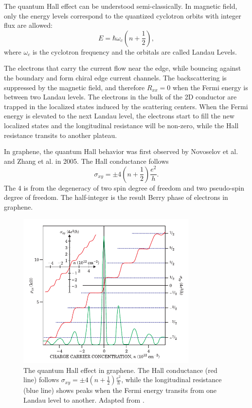 \documentclass[pdflatex, sectionletters, 12pt]{pittetd}    %
\begin{document}
The quantum Hall effect can be understood semi-classically. In magnetic field, only the energy levels correspond to the quantized cyclotron orbits with integer flux are allowed:
$$E = \hbar\omega_c \left(n + \frac{1}{2}\right),$$
where $\omega_c$ is the cyclotron frequency and the orbitals are called Landau Levels.

The electrons that carry the current flow near the edge, while bouncing against the boundary and form chiral edge current channels. The backscattering is suppressed by the magnetic field, and therefore $R_{xx} = 0$ when the Fermi energy is between two Landau levels. The electrons in the bulk of the 2D conductor are trapped in the localized states induced by the scattering centers. When the Fermi energy is elevated to the next Landau level, the electrons start to fill the new localized states and the longitudinal resistance will be non-zero, while the Hall resistance transits to another plateau.

In graphene, the quantum Hall behavior was first observed by Novoselov et al.\cite{novoselov2005two} and Zhang et al.\cite{zhang2005experimental} in 2005. The Hall conductance follows
$$
\sigma_{xy} = \pm 4\left(n + \frac{1}{2}\right)\frac{e^2}{h}.
$$
The 4 is from the degeneracy of two spin degree of freedom and two pseudo-spin degree of freedom. The half-integer is the result Berry phase of electrons\cite{zhang2005experimental} in graphene.

\begin{figure}[p]
	\centering
	\includegraphics[width=0.8\textwidth]{Drawing/GrapheneQuantumHall.pdf}
	\caption{The quantum Hall effect in graphene. The Hall conductance (red line) follows $\displaystyle \sigma_{xy} = \pm4\left(n + \frac{1}{2}\right)\frac{e^2}{h}$, while the longitudinal resistance (blue line) shows peaks when the Fermi energy transits from one Landau level to another. Adapted from \cite{novoselov2005two}.}
	\label{FIG:GrapheneQuantumHall}
\end{figure}
\end{document}

